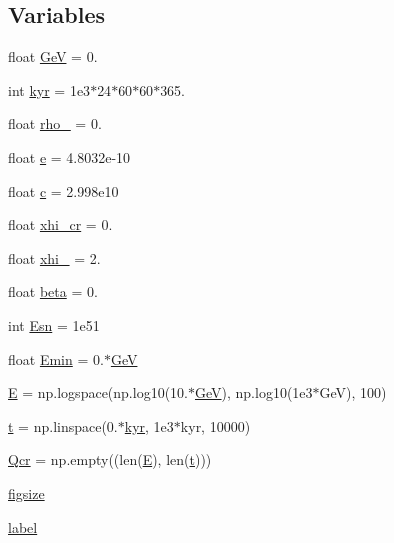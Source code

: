 \subsection*{Variables}
\begin{DoxyCompactItemize}
\item 
float \hyperlink{namespacetest__tesc_a580dcae7e8e8d361c974fbb0fe6bee35}{GeV} = 0.
\item 
int \hyperlink{namespacetest__tesc_aa91867329d3ece5446158c4d3af3ac5a}{kyr} = 1e3$\ast$24$\ast$60$\ast$60$\ast$365.
\item 
float \hyperlink{namespacetest__tesc_a294c18a58c1b8876749b11465aba652e}{rho\+\_} = 0.
\item 
float \hyperlink{namespacetest__tesc_ab826e01cd079a1822d79af10a8d95b42}{e} = 4.\+8032e-\/10
\item 
float \hyperlink{namespacetest__tesc_aed2debd6db9c687f9067b733f0ed5862}{c} = 2.\+998e10
\item 
float \hyperlink{namespacetest__tesc_a05957682dc916c7fa6993b59b427a17d}{xhi\+\_\+cr} = 0.
\item 
float \hyperlink{namespacetest__tesc_af69d36c63b75bd612d425ce0386093f4}{xhi\+\_} = 2.
\item 
float \hyperlink{namespacetest__tesc_aa4b79564062ea1ec889042f5aa63de49}{beta} = 0.
\item 
int \hyperlink{namespacetest__tesc_a11d11077e83ef3b86e547a3e26e5a590}{Esn} = 1e51
\item 
float \hyperlink{namespacetest__tesc_a3f53d131ed6d829798ebac880deeba41}{Emin} = 0.$\ast$\hyperlink{namespacetest__tesc_a580dcae7e8e8d361c974fbb0fe6bee35}{GeV}
\item 
\hyperlink{namespacetest__tesc_a4789c617e691141d9a78952c8e9bbe4d}{E} = np.\+logspace(np.\+log10(10.$\ast$\hyperlink{namespacetest__tesc_a580dcae7e8e8d361c974fbb0fe6bee35}{GeV}), np.\+log10(1e3$\ast$\+Ge\+V), 100)
\item 
\hyperlink{namespacetest__tesc_a29af50144139f72a17bdbed5824b3ec9}{t} = np.\+linspace(0.$\ast$\hyperlink{namespacetest__tesc_aa91867329d3ece5446158c4d3af3ac5a}{kyr}, 1e3$\ast$kyr, 10000)
\item 
\hyperlink{namespacetest__tesc_a147569d13d6d2d9a78f0fc5dcd52b36b}{Qcr} = np.\+empty((len(\hyperlink{namespacetest__tesc_a4789c617e691141d9a78952c8e9bbe4d}{E}), len(\hyperlink{namespacetest__tesc_a29af50144139f72a17bdbed5824b3ec9}{t})))
\item 
\hyperlink{namespacetest__tesc_ac6f6226c1c9275ffe9e30bac9dced074}{figsize}
\item 
\hyperlink{namespacetest__tesc_a7b5ca305b21f5cb89436cbf684c2c323}{label}
\end{DoxyCompactItemize}


